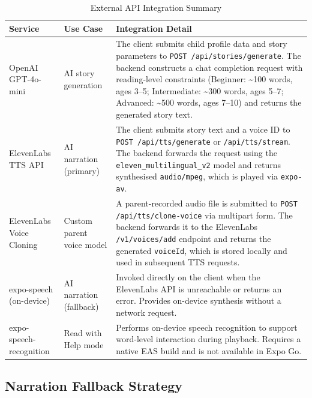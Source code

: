 \begin{table}[H]
\centering
\caption{External API Integration Summary}
\label{tab:api_integration}
\renewcommand{\arraystretch}{1.4}
\begin{tabularx}{\textwidth}{|>{\RaggedRight\arraybackslash}p{3cm}|>{\RaggedRight\arraybackslash}p{3.5cm}|>{\RaggedRight\arraybackslash}X|}
\hline
\textbf{Service} & \textbf{Use Case} & \textbf{Integration Detail} \\
\hline
OpenAI GPT-4o-mini & AI story generation & The client submits child profile data and story parameters to \texttt{POST /api/stories/generate}. The backend constructs a chat completion request with reading-level constraints (Beginner: \textasciitilde100 words, ages 3--5; Intermediate: \textasciitilde300 words, ages 5--7; Advanced: \textasciitilde500 words, ages 7--10) and returns the generated story text. \\
\hline
ElevenLabs TTS API & AI narration (primary) & The client submits story text and a voice ID to \texttt{POST /api/tts/generate} or \texttt{/api/tts/stream}. The backend forwards the request using the \texttt{eleven\_multilingual\_v2} model and returns synthesised \texttt{audio/mpeg}, which is played via \texttt{expo-av}. \\
\hline
ElevenLabs Voice Cloning & Custom parent voice model & A parent-recorded audio file is submitted to \texttt{POST /api/tts/clone-voice} via multipart form. The backend forwards it to the ElevenLabs \texttt{/v1/voices/add} endpoint and returns the generated \texttt{voiceId}, which is stored locally and used in subsequent TTS requests. \\
\hline
expo-speech (on-device) & AI narration (fallback) & Invoked directly on the client when the ElevenLabs API is unreachable or returns an error. Provides on-device synthesis without a network request. \\
\hline
expo-speech-recognition & Read with Help mode & Performs on-device speech recognition to support word-level interaction during playback. Requires a native EAS build and is not available in Expo Go. \\
\hline
\end{tabularx}
\end{table}

\subsection*{Narration Fallback Strategy}

